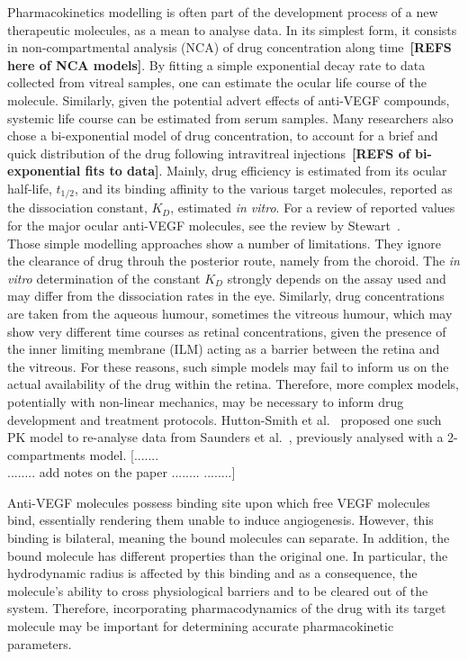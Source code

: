\documentclass[11pt,a4paper, twocolumn]{article}
\begin{document}
Pharmacokinetics modelling is often part of the development process of a new therapeutic molecules, as a mean to analyse data.
In its simplest form, it consists in non-compartmental analysis (NCA) of drug concentration along time~\textbf{[REFS here of NCA models]}.
By fitting a simple exponential decay rate to data collected from vitreal samples, one can estimate the ocular life course of the molecule.
Similarly, given the potential advert effects of anti-VEGF compounds, systemic life course can be estimated from serum samples.
Many researchers also chose a bi-exponential model of drug concentration, to account for a brief and quick distribution of the drug following intravitreal injections~\textbf{[REFS of bi-exponential fits to data]}.
Mainly, drug efficiency is estimated from its ocular half-life, $t_{1/2}$, and its binding affinity to the various target molecules, reported as the dissociation constant, $K_D$, estimated \textit{in vitro}.
For a review of reported values for the major ocular anti-VEGF molecules, see the review by Stewart~\cite{stewart_pharmacokinetics_2014}.\\
Those simple modelling approaches show a number of limitations.
They ignore the clearance of drug throuh the posterior route, namely from the choroid.
The \textit{in vitro} determination of the constant $K_D$ strongly depends on the assay used and may differ from the dissociation rates in the eye.
Similarly, drug concentrations are taken from the aqueous humour, sometimes the vitreous humour, which may show very different time courses as retinal concentrations, given the presence of the inner limiting membrane (ILM) acting as a barrier between the retina and the vitreous.
For these reasons, such simple models may fail to inform us on the actual availability of the drug within the retina.
Therefore, more complex models, potentially with non-linear mechanics, may be necessary to inform drug development and treatment protocols.
Hutton-Smith et al.~\cite{hutton-smith_ocular_2017} proposed one such PK model to re-analyse data from Saunders et al.~\cite{saunders_model_2015}, previously analysed with a 2-compartments model.
[.......\\
........
add notes on the paper
........
........]

Anti-VEGF molecules possess binding site upon which free VEGF molecules bind, essentially rendering them unable to induce angiogenesis.
However, this binding is bilateral, meaning the bound molecules can separate.
In addition, the bound molecule has different properties than the original one.
In particular, the hydrodynamic radius is affected by this binding and as a consequence, the molecule's ability to cross physiological barriers and to be cleared out of the system.
Therefore, incorporating pharmacodynamics of the drug with its target molecule may be important for determining accurate pharmacokinetic parameters.
\end{document}
